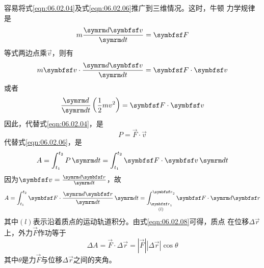容易将式\eqref{eqn:06.02.04}及式\eqref{eqn:06.02.06}推广到三维情况。这时，牛顿
力学规律是
\begin{equation*}
 m \frac { \dif \vec{ v } } { \dif t } = \vec{F}
\end{equation*}
等式两边点乘$ \vec{ v } $，则有
\begin{equation*}
 m \vec{v} \cdot \frac { \dif \vec{v} } { \dif t } = \vec{F} \cdot \vec{v}
\end{equation*}
或者
\begin{equation*}
 \frac { \dif } { \dif t } \left( \frac { 1 } { 2 } m v ^ { 2 } \right) = \vec{F} \cdot \vec{v}
\end{equation*}
因此，代替式\eqref{eqn:06.02.04}，是
\begin{equation}\label{eqn:06.02.07}
 P = \vec{F} \cdot \vec{v}
\end{equation}
代替式\eqref{eqn:06.02.06}，是
\begin{equation*}
 A = \int _ { t _ { 1 } } ^ { t _ { 2 } } P \dif t = \int _ { t _ { 1 } } ^ { t _ { 2 } } \vec{F} \cdot \vec{v} \dif t
\end{equation*}
因为$ \vec{ v } = \frac { \dif \vec{ r } } { \dif t } $，故
\begin{equation}\label{eqn:06.02.08}
 A = \int _ { t _ { 1 } } ^ { t _ { 2 } } \vec{ F } \cdot \frac { \dif \vec { r } } { \dif t } \dif t = \mathop{\int _ { \vec{r} _ { 1 } } ^ { \vec{r} _ { 2 } }}\limits _ { ( l ) } \vec{F} \cdot \dif \vec{r}
\end{equation}
其中$ (l) $表示沿着质点的运动轨道积分。由式\eqref{eqn:06.02.08}可得，质点
在位移$ \Delta \vec{r} $上，外力$ \vec{F} $作功等于
\begin{equation}\label{eqn:06.02.09}
 \Delta A = \vec{F} \cdot \Delta \vec{r} = |\vec{F}| |\Delta \vec{r}| \cos \theta
\end{equation}
其中$ \theta $是力$ \vec{F} $与位移$ \Delta \vec{r} $之间的夹角。